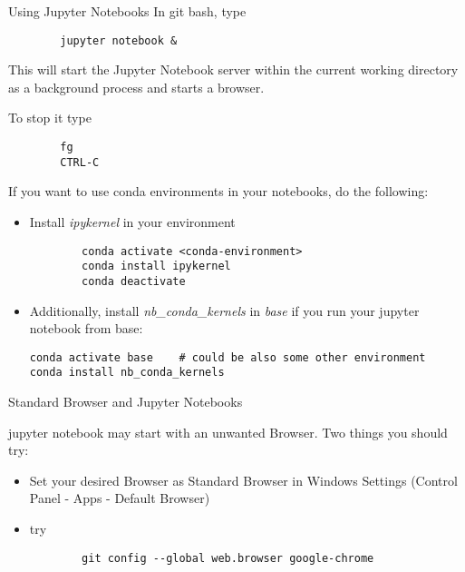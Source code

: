 \begin{frame}[fragile]{Using Jupyter Notebooks}
		In git bash, type
		\begin{verbatim}
		jupyter notebook &
		\end{verbatim}
		This will start the Jupyter Notebook server within the current working directory as a background process and starts a browser.
		
		To stop it type
		\begin{verbatim}
		fg
		CTRL-C
		\end{verbatim}
		
		If you want to use conda environments in your notebooks, do the following:
		\begin{itemize}
			\item Install \textit{ipykernel} in your environment
		
		\begin{verbatim}
		conda activate <conda-environment>
		conda install ipykernel
		conda deactivate
		\end{verbatim}
		\item Additionally, install \textit{nb\_conda\_kernels} in \textit{base} if you run your jupyter notebook from base:
		\begin{verbatim}
conda activate base    # could be also some other environment
conda install nb_conda_kernels
		 \end{verbatim}
		\end{itemize}
		
\end{frame}

\begin{frame}[fragile]{Standard Browser and Jupyter Notebooks}
	
	jupyter notebook may start with an unwanted Browser. Two things you should try:
	\begin{itemize}
		\item Set your desired Browser as Standard Browser in Windows Settings (Control Panel - Apps - Default Browser)
		\item try
			\begin{verbatim}
		git config --global web.browser google-chrome	\end{verbatim}
		
	\end{itemize}
	
\end{frame}


